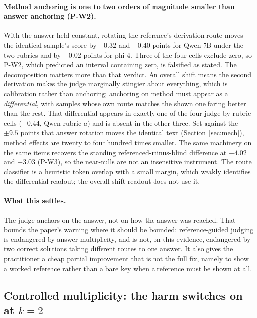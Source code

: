 \documentclass[11pt]{article}
\begin{document}
\paragraph{Method anchoring is one to two orders of magnitude smaller than answer anchoring (P-W2).}
With the answer held constant, rotating the reference's derivation route moves the identical sample's score by $-0.32$ and $-0.40$ points for Qwen-7B under the two rubrics and by $-0.02$ points for phi-4.
Three of the four cells exclude zero, so P-W2, which predicted an interval containing zero, is falsified as stated.
The decomposition matters more than that verdict.
An overall shift means the second derivation makes the judge marginally stingier about everything, which is calibration rather than anchoring; anchoring on method must appear as a \emph{differential}, with samples whose own route matches the shown one faring better than the rest.
That differential appears in exactly one of the four judge-by-rubric cells ($-0.44$, Qwen rubric $a$) and is absent in the other three.
Set against the $\pm 9.5$ points that answer rotation moves the identical text (Section~\ref{sec:mech}), method effects are twenty to four hundred times smaller.
The same machinery on the same items recovers the standing referenced-minus-blind difference at $-4.02$ and $-3.03$ (P-W3), so the near-nulls are not an insensitive instrument.
The route classifier is a heuristic token overlap with a small margin, which weakly identifies the differential readout; the overall-shift readout does not use it.

\paragraph{What this settles.}
The judge anchors on the answer, not on how the answer was reached.
That bounds the paper's warning where it should be bounded: reference-guided judging is endangered by answer multiplicity, and is not, on this evidence, endangered by two correct solutions taking different routes to one answer.
It also gives the practitioner a cheap partial improvement that is not the full fix, namely to show a worked reference rather than a bare key when a reference must be shown at all.

\FloatBarrier
\subsection{Controlled multiplicity: the harm switches on at \texorpdfstring{$k{=}2$}{k=2}}
\label{sec:synthk}
\end{document}
